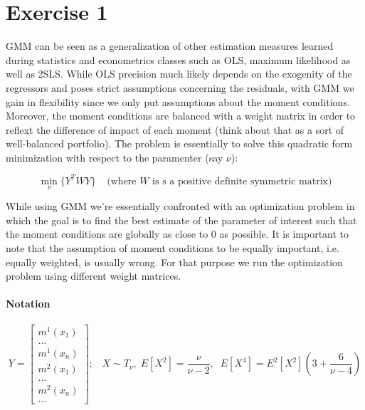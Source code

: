 \chapter{Exercise 1}
GMM can be seen as a generalization of other estimation measures learned during statistics and econometrics classes such as OLS, maximum likelihood as well as 2SLS. While OLS precision much likely depends on the exogenity of the regressors and poses strict assumptions concerning the residuals, with GMM we gain in flexibility since we only put assumptions about the moment conditions. Moreover, the moment conditions are balanced with a weight matrix in order to reflext the difference of impact of each moment (think about that as a sort of well-balanced portfolio). The problem is essentially to solve this quadratic form minimization with respect to the paramenter (say $\nu$):

\begin{equation*}
    \min_\nu \{Y^T WY\} \;\;\;\;\text{(where $W$ is s a positive definite symmetric matrix)}
\end{equation*}

\noindent 
While using GMM we’re essentially confronted with an optimization problem in which the goal is to find the best estimate of the parameter of interest such that the moment conditions are globally as close to 0 as possible. It is important to note that the assumption of moment conditions to be equally important, i.e. equally weighted, is usually wrong. For that purpose we run the optimization problem using different weight matrices.

\subsubsection{Notation}
\begin{equation*}
    Y=
    \begin{bmatrix}
        m^1(x_1)\\
        ...\\
        m^1(x_n)\\
        m^2(x_1)\\
        ...\\
        m^2(x_n)\\
        ...
    \end{bmatrix};\;\;\;
    X \sim T_\nu, \; E[X^2]=\frac{\nu}{\nu-2},\;\;
    E[X^4]=E^2[X^2](3+\frac{6}{\nu-4})
\end{equation*}


\newpage

